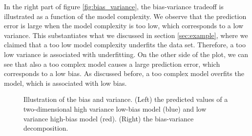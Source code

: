 In the right part of figure \eqref{fig:bias_variance}, the bias-variance tradeoff is illustrated as a function of the model complexity. We observe that the prediction error is large when the model complexity is too low, which corresponds to a low variance. This substantiates what we discussed in section \ref{sec:example}, where we claimed that a too low model complexity underfits the data set. Therefore, a too low variance is associated with underfitting. On the other side of the plot, we can see that also a too complex model causes a large prediction error, which corresponds to a low bias. As discussed before, a too complex model overfits the model, which is associated with low bias. 

\begin{figure}
	\centering
	
	\caption{Illustration of the bias and variance. (Left) the predicted values of a two-dimensional high variance low-bias model (blue) and low variance high-bias model (red). (Right) the bias-variance decomposition.}
	\label{fig:bias_variance}
\end{figure}

